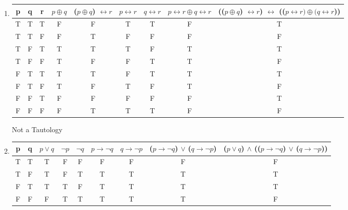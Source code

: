 \documentclass[twoside]{article}
\begin{document}
\begin{enumerate}

    \item 

        \begin{tabular}{|c|c|c|c|c|c|c|c|c|}
            \hline
            p & q & r & $p \oplus q$ & ($p \oplus q$) $\leftrightarrow r$ & $p \leftrightarrow r$ & $q \leftrightarrow r$ & $p \leftrightarrow r \oplus q \leftrightarrow r$ &  (($p \oplus q$) $\leftrightarrow r$) $\leftrightarrow$ (($p \leftrightarrow r) \oplus (q \leftrightarrow r$))\\
            \hline 
            T & T & T & F & F & T & T & F & T \\
            T & T & F & F & T & F & F & F & F \\
            T & F & T & T & T & T & F & T & T \\
            T & F & F & T & F & F & T & T & F \\
            F & T & T & T & T & F & T & T & T \\
            F & T & F & T & F & T & F & T & F \\
            F & F & T & F & F & F & F & F & T \\
            F & F & F & F & T & T & T & F & F \\
            \hline
        \end{tabular}

        Not a Tautology
    
    \item %
            \begin{tabular}{|c|c|c|c|c|c|c|c|c|}
                \hline
                p & q & $p \vee q$ &$\neg p$ &$\neg q$ & $p \rightarrow \neg q$ &  $q \rightarrow \neg p$ & ($p \rightarrow \neg q$) $ \vee $ ($q \rightarrow \neg p$) & ($p \vee q$) $\wedge$ (($p \rightarrow \neg q$) $ \vee $ ($q \rightarrow \neg p$)) \\
                \hline 
                T & T & T & F & F & F & F & F & F \\
                T & F & T & F & T & T & T & T & T \\
                F & T & T & T & F & T & T & T & T \\
                F & F & F & T & T & T & T & T & F \\
                \hline
            \end{tabular}


\end{enumerate}
\end{document}

